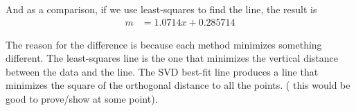 And as a comparison, if we use least-squares to find the line, the result is
\begin{align*}
m & = 1.0714x+ 0.285714
\end{align*}

The reason for the difference is because each method minimizes something different.  The least-squares line is the one that minimizes the vertical distance between the data and the line.  The SVD best-fit line produces a line that minimizes the square of the orthogonal distance to all the points.  ({\color{red} this would be good to prove/show at some point}).  

